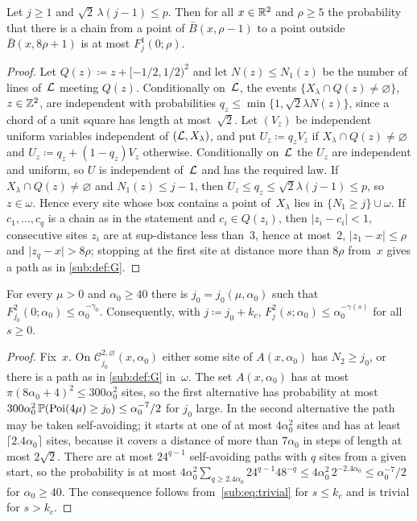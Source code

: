 \documentclass[11pt,letterpaper]{article}
\newcommand{\cC}{\mathcal C}
\begin{document}
\begin{lemma}[Domination]
\label{sub:lem:domination}
Let $j\ge1$ and $\sqrt2\,\lambda(j-1)\le p$. Then for all $x\in\R^2$ and $\rho\ge5$ the probability that there is a chain from a point of $\bar B(x,\rho-1)$ to a point outside $\bar B(x,8\rho+1)$ is at most $F_j^1(0;\rho)$.
\end{lemma}

\begin{proof}
Let $Q(z)\coloneqq z+[-1/2,1/2)^2$ and let $N(z)\le N_1(z)$ be the number of lines of~$\cL$ meeting $Q(z)$. Conditionally on~$\cL$, the events $\{X_\lambda\cap Q(z)\neq\varnothing\}$, $z\in\Z^2$, are independent with probabilities $q_z\le\min\{1,\sqrt2\lambda N(z)\}$, since a chord of a unit square has length at most~$\sqrt2$. Let $(V_z)$ be independent uniform variables independent of $(\cL,X_\lambda)$, and put $U_z\coloneqq q_zV_z$ if $X_\lambda\cap Q(z)\neq\varnothing$ and $U_z\coloneqq q_z+(1-q_z)V_z$ otherwise. Conditionally on~$\cL$ the $U_z$ are independent and uniform, so $U$ is independent of~$\cL$ and has the required law. If $X_\lambda\cap Q(z)\neq\varnothing$ and $N_1(z)\le j-1$, then $U_z\le q_z\le\sqrt2\lambda(j-1)\le p$, so $z\in\omega$. Hence every site whose box contains a point of~$X_\lambda$ lies in $\{N_1\ge j\}\cup\omega$. If $c_1,\dots,c_q$ is a chain as in the statement and $c_i\in Q(z_i)$, then $\lvert z_i-c_i\rvert<1$, consecutive sites $z_i$ are at sup-distance less than~$3$, hence at most~$2$, $\lvert z_1-x\rvert\le\rho$ and $\lvert z_q-x\rvert>8\rho$; stopping at the first site at distance more than $8\rho$ from~$x$ gives a path as in \cref{sub:def:G}.
\end{proof}

\begin{lemma}
\label{sub:lem:base}
For every $\mu>0$ and $\alpha_0\ge40$ there is $j_0=j_0(\mu,\alpha_0)$ such that $F^2_{j_0}(0;\alpha_0)\le\alpha_0^{-\gamma_0}$. Consequently, with $j\coloneqq j_0+k_c$, $F^2_j(s;\alpha_0)\le\alpha_0^{-\gamma(s)}$ for all $s\ge0$.
\end{lemma}

\begin{proof}
Fix~$x$. On $\cC^{2,\varnothing}_{j_0}(x,\alpha_0)$ either some site of $A(x,\alpha_0)$ has $N_2\ge j_0$, or there is a path as in \cref{sub:def:G} in~$\omega$. The set $A(x,\alpha_0)$ has at most $\pi(8\alpha_0+4)^2\le300\alpha_0^2$ sites, so the first alternative has probability at most $300\alpha_0^2\,\P(\mathrm{Poi}(4\mu)\ge j_0)\le\alpha_0^{-7}/2$ for $j_0$ large. In the second alternative the path may be taken self-avoiding; it starts at one of at most $4\alpha_0^2$ sites and has at least $\lceil2.4\alpha_0\rceil$ sites, because it covers a distance of more than $7\alpha_0$ in steps of length at most $2\sqrt2$. There are at most $24^{q-1}$ self-avoiding paths with $q$ sites from a given start, so the probability is at most $4\alpha_0^2\sum_{q\ge2.4\alpha_0}24^{q-1}48^{-q}\le4\alpha_0^2\,2^{-2.4\alpha_0}\le\alpha_0^{-7}/2$ for $\alpha_0\ge40$. The consequence follows from~\eqref{sub:eq:trivial} for $s\le k_c$ and is trivial for $s>k_c$.
\end{proof}
\end{document}
